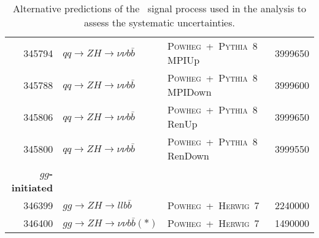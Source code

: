 \begin{table}[hb]
{\begin{tabular}{rllr}
      345794 & $qq\to ZH \to \nu\nu b\bar{b}$  & \textsc{Powheg}~+~\textsc{Pythia}~8  MPIUp & 3999650 \\
      345788 & $qq\to ZH \to \nu\nu b\bar{b}$  & \textsc{Powheg}~+~\textsc{Pythia}~8  MPIDown & 3999600 \\
      345806 & $qq\to ZH \to \nu\nu b\bar{b}$  & \textsc{Powheg}~+~\textsc{Pythia}~8  RenUp & 3999650 \\
      345800 & $qq\to ZH \to \nu\nu b\bar{b}$  & \textsc{Powheg}~+~\textsc{Pythia}~8  RenDown & 3999550 \\
      {\bfseries $gg$-initiated} & & & \\
      346399 & $gg\to ZH \to ll b\bar{b}$    & \textsc{Powheg}~+~\textsc{Herwig}~7   & 2240000 \\
      346400 & $gg\to ZH \to \nu\nu b\bar{b}(*) $  &  \textsc{Powheg}~+~\textsc{Herwig}~7   &  1490000 \\
      \bottomrule
    \end{tabular}
  }
  \caption[Alternative predictions of the \VHbb\ signal process.]{Alternative
    predictions of the \VHbb\ signal process used in the analysis to assess the
    systematic uncertainties.}
  \label{tab:VHSMsignals-alt}
\end{table}